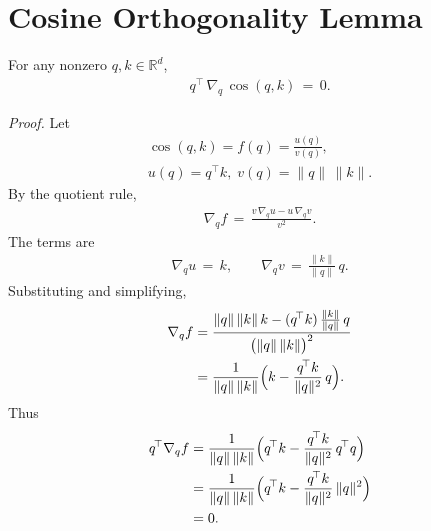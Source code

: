 \section{Cosine Orthogonality Lemma}
\label{app:cos-orth-lemma}

For any nonzero $q,k\in\mathbb{R}^d$,
\begin{align}
q^{\!\top}\,\nabla_q\,\cos(q,k) \,=\, 0.
\end{align}

\noindent\textit{Proof.} Let
\begin{equation}
\begin{aligned}
\cos(q,k) = f(q) = \frac{u(q)}{v(q)}, \\
u(q)=q^{\!\top}k,\; v(q)=\|q\|\,\|k\|.
\end{aligned}
\end{equation}
By the quotient rule,
\begin{align}
\nabla_q f \,=\, \frac{v\,\nabla_q u - u\,\nabla_q v}{v^2}.
\end{align}
The terms are
\begin{align}
\nabla_q u \,=\, k, \qquad \nabla_q v \,=\, \frac{\|k\|}{\|q\|}\, q.
\end{align}
Substituting and simplifying,
\begin{equation}
\begin{aligned}
\nabla_q f 
&= \frac{\|q\|\,\|k\|\,k - (q^{\!\top}k)\,\frac{\|k\|}{\|q\|}\, q}{\bigl(\|q\|\,\|k\|\bigr)^2} \\
&= \frac{1}{\|q\|\,\|k\|}\Bigl(k - \frac{q^{\!\top}k}{\|q\|^2}\, q\Bigr).
\end{aligned}
\end{equation}
Thus
\begin{equation}
\begin{aligned}
q^{\!\top}\nabla_q f 
&= \frac{1}{\|q\|\,\|k\|}\Bigl(q^{\!\top}k - \frac{q^{\!\top}k}{\|q\|^2}\, q^{\!\top}q\Bigr) \\
&= \frac{1}{\|q\|\,\|k\|}\Bigl(q^{\!\top}k - \frac{q^{\!\top}k}{\|q\|^2}\, \|q\|^2\Bigr) \\
&= 0. \qquad
\end{aligned}
\end{equation}



